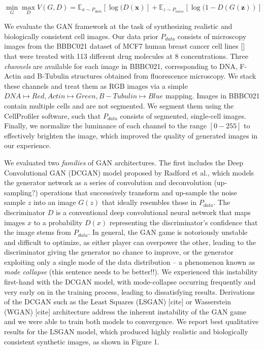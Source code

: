\documentclass{article}
\begin{document}
$$\min_G \max_D V(G, D) = \mathbb{E}_{x \sim P_{data}}[\log(D(\mathbf{x})] + \mathbb{E}_{z \sim P_{noise}}[\log(1 - D(G(\mathbf{z}))]$$


We evaluate the GAN framework at the task of synthesizing realistic and biologically consistent cell images. Our data prior $P_{data}$ consists of microscopy images from the BBBC021 dataset of MCF7 human breast cancer cell lines [] that were treated with 113 different drug molecules at 8 concentrations. Three \emph{channels} are available for each image in BBBC021, corresponding to DNA, F-Actin and B-Tubulin structures obtained from fluorescence microscopy. We stack these channels and treat them as RGB images via a simple $DNA \mapsto Red, Actin \mapsto Green, B-Tubulin \mapsto Blue$ mapping. Images in BBBC021 contain multiple cells and are not segmented. We segment them using the CellProfiler software, such that $P_{data}$ consists of segmented, single-cell images. Finally, we normalize the luminance of each channel to the range $[0-255]$ to effectively brighten the image, which improved the quality of generated images in our experience.

We evaluated two \emph{families} of GAN architectures. The first includes the Deep Convolutional GAN (DCGAN) model proposed by Radford et al., which models the generator network as a series of convolution and deconvolution (up-sampling?) operations that successively transform and up-sample the noise sample $z$ into an image $G(z)$ that ideally resembles those in $P_{data}$. The discriminator $D$ is a conventional deep convolutional neural network that maps images $x$ to a probability $D(x)$ representing the discriminator's confidence that the image stems from $P_{data}$. In general, the GAN game is notoriously unstable and difficult to optimize, as either player can overpower the other, leading to the discriminator giving the generator no chance to improve, or the generator exploiting only a single mode of the data distribution -- a phenomenon known as \emph{mode collapse} (this sentence needs to be better!!). We experienced this instability first-hand with the DCGAN model, with mode-collapse occurring frequently and very early on in the training process, leading to dissatisfying results. Derivations of the DCGAN such as the Least Squares (LSGAN) [cite] or Wasserstein (WGAN) [cite] architecture address the inherent instability of the GAN game and we were able to train both models to convergence. We report best qualitative results for the LSGAN model, which produced highly realistic and biologically consistent synthetic images, as shown in Figure 1.
\end{document}
